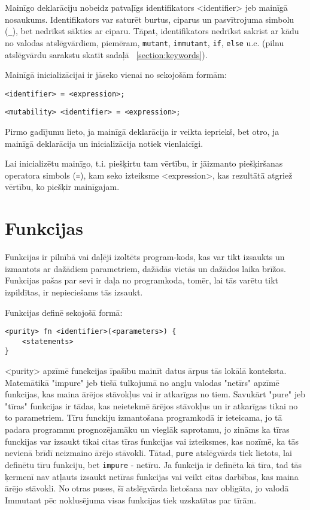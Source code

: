 \documentclass[12pt,a4paper]{report}
\begin{document}
Mainīgo deklarāciju nobeidz patvaļīgs identifikators <identifier> jeb mainīgā nosaukums. Identifikators var saturēt burtus, ciparus un pasvītrojuma simbolu (\texttt{\_}), bet nedrīkst sākties ar ciparu. Tāpat, identifikators nedrīkst sakrist ar kādu no valodas atslēgvārdiem, piemēram, \texttt{mutant}, \texttt{immutant}, \texttt{if}, \texttt{else} u.c. (pilnu atslēgvārdu sarakstu skatīt sadaļā ~\ref{section:keywords}).

Mainīgā inicializācijai ir jāseko vienai no sekojošām formām:

\begin{verbatim}
<identifier> = <expression>;
\end{verbatim}  

\begin{verbatim}
<mutability> <identifier> = <expression>;
\end{verbatim}  

Pirmo gadījumu lieto, ja mainīgā deklarācija ir veikta iepriekš, bet otro, ja mainīgā deklarācija un inicializācija notiek vienlaicīgi.

Lai inicializētu mainīgo, t.i. piešķirtu tam vērtību, ir jāizmanto piešķiršanas operatora simbols (\texttt{=}), kam seko izteiksme <expression>, kas rezultātā atgriež vērtību, ko piešķir mainīgajam.

\section{Funkcijas}
\label{section:functions}

Funkcijas ir pilnībā vai daļēji izoltēts program-kods, kas var tikt izsaukts un izmantots ar dažādiem parametriem, dažādās vietās un dažādos laika brīžos. Funkcijas pašas par sevi ir daļa no programkoda, tomēr, lai tās varētu tikt izpildītas, ir nepieciešams tās izsaukt. 

Funkcijas definē sekojošā formā:
\begin{verbatim}
<purity> fn <identifier>(<parameters>) {
    <statements>
}
\end{verbatim}

<purity> apzīmē funckcijas īpašību mainīt datus ārpus tās lokālā konteksta. Matemātikā "impure" jeb tiešā tulkojumā no angļu valodas "netīrs" apzīmē funkcijas, kas maina ārējos stāvokļus vai ir atkarīgas no tiem. Savukārt "pure" jeb "tīras" funkcijas ir tādas, kas neietekmē ārējos stāvokļus un ir atkarīgas tikai no to parametriem. Tīru funckiju izmantošana programkodā ir ieteicama, jo tā padara programmu prognozējamāku un vieglāk saprotamu, jo zināms ka tīras funckijas var izsaukt tikai citas tīras funkcijas vai izteiksmes, kas nozīmē, ka tās nevienā brīdī neizmaino ārējo stāvokli. Tātad, \texttt{pure} atslēgvārds tiek lietots, lai definētu tīru funkciju, bet \texttt{impure} - netīru. Ja funkcija ir definēta kā tīra, tad tās ķermenī nav atļauts izsaukt netīras funkcijas vai veikt citas darbības, kas maina ārējo stāvokli. No otras puses, šī atslēgvārda lietošana nav obligāta, jo valodā Immutant pēc noklusējuma visas funkcijas tiek uzskatītas par tīrām.
\end{document}
